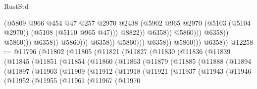 \begin{lexlean}{RustStd}
\begin{coremodule}
                                                            (@5809
                                                              @966
                                                              @454
                                                              @47
                                                              @257
                                                              @2970
                                                              @2438
                                                              (@5902
                                                                @965
                                                                @2970
                                                                (@5103 (@5104 @2970))
                                                                (@5108 (@5110 @965 @47)))
                                                              @8822))
                                                          @6358))
                                                      @5860)))
                                                @6358))
                                            @5860)))
                                      @6358))
                                  @5860)))
                            @6358))
                        @5860)))
                  @6358))
              @5860)))
        @6358))
@12258 := @11796
    (@11802
      (@11805
        (@11821
          (@11827
            (@11830
              (@11836
                (@11839
                  (@11845
                    (@11851
                      (@11854
                        (@11860
                          (@11863
                            (@11879
                              (@11885
                                (@11888
                                  (@11894
                                    (@11897
                                      (@11903
                                        (@11909
                                          (@11912
                                            (@11918
                                              (@11921
                                                (@11937
                                                  (@11943
                                                    (@11946
                                                      (@11952
                                                        (@11955
                                                          (@11961
                                                            (@11967
                                                              (@11970

\end{coremodule}
\end{lexlean}
